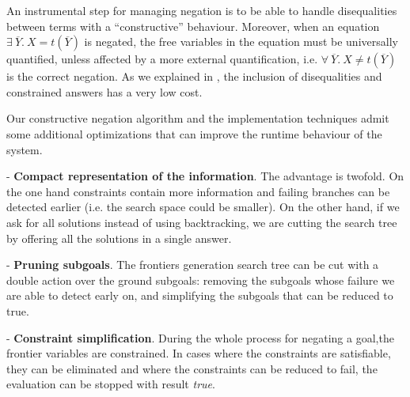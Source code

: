 \documentclass{llncs}
\begin{document}
An instrumental step for managing negation is to be able to handle
disequalities between terms with a ``constructive'' behaviour.
Moreover, when an equation $ \exists ~ \overline{Y}. ~ X =
t(\overline{Y})$ is negated, the free variables in the equation must
be universally quantified, unless affected by a more external
quantification, i.e. $\forall~ \overline{Y}.~X \neq t(\overline{Y})$
is the correct negation.  As we explained in \cite{SusanaPADL2000},
the inclusion of disequalities and constrained answers has a very low
cost.



Our constructive negation algorithm and the implementation techniques
admit some additional optimizations that can improve the runtime
behaviour of the system.

\noindent
- {\bf Compact representation of the information}. The advantage is
twofold. On the one hand constraints contain more information and
failing branches can be detected earlier (i.e. the search space could
be smaller). On the other hand, if we ask for all solutions instead of
using backtracking, we are cutting the search tree by offering all the
solutions in a single answer.

\noindent
- {\bf Pruning subgoals}. The frontiers generation search tree can be
cut with a double action over the ground subgoals: removing the
subgoals whose failure we are able to detect early on, and simplifying the
subgoals that can be reduced to true.

\noindent
- {\bf Constraint simplification}. During the whole process for negating
a goal,the frontier variables are constrained. In cases where the
constraints are satisfiable, they can be eliminated and where the
constraints can be reduced to fail, the evaluation can be stopped with
result \emph{true}.
 
\end{document}
